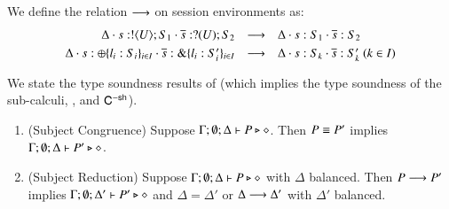 \begin{definition}%
\label{def:ses_red}
We define the relation $\longrightarrow$ on session environments as:
\[
\begin{array}{rcl}
\Delta \cdot s: ! \langle U \rangle ; S_1 \cdot \overline{s}: ? (U) ; S_2 & \longrightarrow & 
\Delta \cdot s: S_1 \cdot \overline{s}: S_2\\[1mm]
\Delta \cdot s: \oplus \{l_i: S_i\}_{i \in I} \cdot \overline{s}: \& \{l_i: S_i'\}_{i \in I} & \longrightarrow & \Delta \cdot s: S_k \cdot \overline{s}: S_k' \ (k \in I)
\end{array}
\]
\end{definition}

We state the type soundness results of \HOp (which implies 
the type soundness of the sub-calculi, \HO, \sessp and $\mathsf{C}^{-\mathsf{sh}}$). 

\begin{theorem}\label{t:sr}%
	\begin{enumerate}[1.]
	\item	(Subject Congruence) Suppose $\Gamma; \emptyset; \Delta \vdash P \triangleright \diamond$.
		Then $P \equiv P'$ implies $\Gamma; \emptyset; \Delta \vdash P' \triangleright \diamond$.

	\item	(Subject Reduction) Suppose $\Gamma; \emptyset; \Delta \vdash P \triangleright \diamond$
			with
			$\Delta$ balanced. 
			Then $P \longrightarrow P'$ implies $\Gamma; \emptyset; \Delta'  \vdash P' \triangleright \diamond$
			and $\Delta = \Delta'$ or $\Delta \longrightarrow \Delta'$
with $\Delta'$ balanced. 
	\end{enumerate}
\end{theorem}
